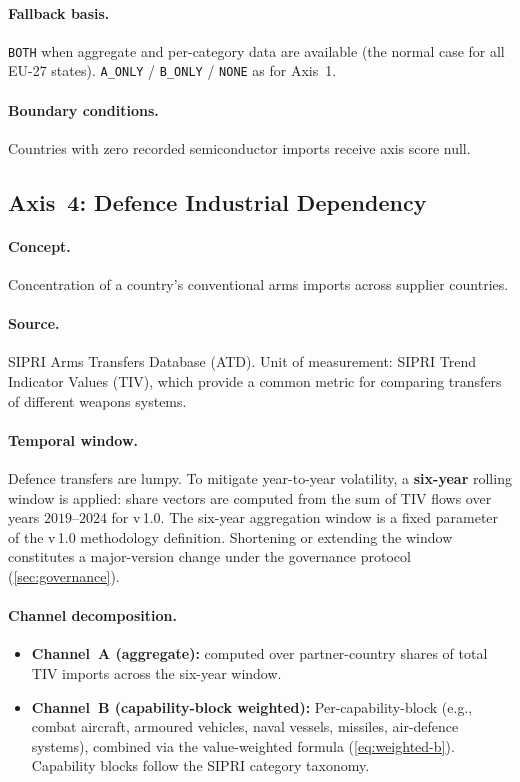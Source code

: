 \paragraph{Fallback basis.}
\texttt{BOTH} when aggregate and per-category data are available (the
normal case for all EU-27 states).  \texttt{A\_ONLY} / \texttt{B\_ONLY} /
\texttt{NONE} as for Axis~1.

\paragraph{Boundary conditions.}
Countries with zero recorded semiconductor imports receive axis
score null.

\subsection{Axis~4: Defence Industrial Dependency}\label{sec:axis:defence}

\paragraph{Concept.}
Concentration of a country's conventional arms imports across supplier
countries.

\paragraph{Source.}
SIPRI Arms Transfers Database (ATD).  Unit of measurement: SIPRI Trend
Indicator Values (TIV), which provide a common metric for comparing
transfers of different weapons systems.

\paragraph{Temporal window.}
Defence transfers are lumpy.  To mitigate year-to-year volatility, a
\textbf{six-year} rolling window is applied: share vectors are computed
from the sum of TIV flows over years \(2019\)--\(2024\) for v\,1.0.
The six-year aggregation window is a fixed parameter of the v\,1.0
methodology definition.  Shortening or extending the window constitutes
a major-version change under the governance protocol
(\cref{sec:governance}).

\paragraph{Channel decomposition.}
\begin{itemize}
  \item \textbf{Channel~A (aggregate):}  \HHI computed over partner-country
    shares of total TIV imports across the six-year window.
  \item \textbf{Channel~B (capability-block weighted):}  Per-capability-block
    \HHI (e.g., combat aircraft, armoured vehicles, naval vessels, missiles,
    air-defence systems), combined via the value-weighted formula
    (\cref{eq:weighted-b}).  Capability blocks follow the SIPRI category
    taxonomy.
\end{itemize}

